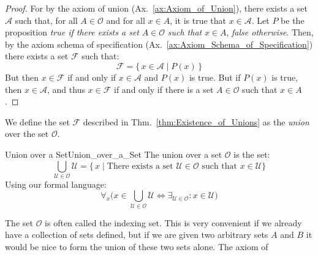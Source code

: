         \begin{proof}
            For by the axiom of union (Ax.~\ref{ax:Axiom_of_Union}), there
            exists a set $\mathcal{A}$ such that, for all $A\in\mathcal{O}$
            and for all $x\in{A}$, it is true that $x\in\mathcal{A}$. Let
            $P$ be the proposition \textit{true if there exists a set}
            $A\in\mathcal{O}$ \textit{such that} $x\in{A}$,
            \textit{false otherwise}. Then, by the axiom schema of specification
            (Ax.~\ref{ax:Axiom_Schema_of_Specification}) there exists a set
            $\mathcal{F}$ such that:
            \begin{equation}
                \mathcal{F}=\big\{\,x\in\mathcal{A}\;|\;P(x)\,\big\}
            \end{equation}
            But then $x\in\mathcal{F}$ if and only if $x\in\mathcal{A}$ and
            $P(x)$ is true. But if $P(x)$ is true, then $x\in\mathcal{A}$, and
            thus $x\in\mathcal{F}$ if and only if there is a set
            $A\in\mathcal{O}$ such that $x\in{A}$.
        \end{proof}
        We define the set $\mathcal{F}$ described in
        Thm.~\ref{thm:Existence_of_Unions} as the \textit{union}%
         over the set $\mathcal{O}$.
        \begin{fdefinition}{Union over a Set}{Union_over_a_Set}
            The \gls{union over a set} $\mathcal{O}$ is the set:
            \begin{equation*}
                \bigcup_{\mathcal{U}\in\mathcal{O}}\mathcal{U}
                =\big\{\,x\;|\;\textrm{There exists a set }
                         \mathcal{U}\in\mathcal{O}\textrm{ such that }
                         x\in\mathcal{U}\big\}
            \end{equation*}
            Using our formal language:
            \begin{equation*}
                \forall_{x}\Big(
                    x\in\bigcup_{\mathcal{U}\in\mathcal{O}}\mathcal{U}
                    \Leftrightarrow\exists_{\mathcal{U}\in\mathcal{O}}:
                    x\in\mathcal{U}\Big)
            \end{equation*}
        \end{fdefinition}
        The set $\mathcal{O}$ is often called the indexing set.
        This is very convenient if we already have a collection of sets
        defined, but if we are given two arbitrary sets $A$ and $B$ it would
        be nice to form the union of these two sets alone. The axiom of
